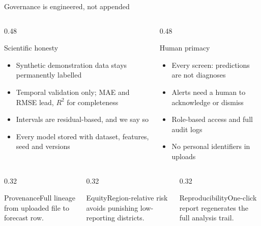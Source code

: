 \documentclass[aspectratio=169,11pt]{beamer}
\begin{document}
\begin{frame}{Governance is engineered, not appended}
  \begin{columns}[c]
    \begin{column}{0.48\textwidth}
      \begin{block}{Scientific honesty}
        \begin{itemize}\small
          \item Synthetic demonstration data stays permanently labelled
          \item Temporal validation only; MAE and RMSE lead, $R^2$ for completeness
          \item Intervals are residual-based, and we say so
          \item Every model stored with dataset, features, seed and versions
        \end{itemize}
      \end{block}
    \end{column}
    \begin{column}{0.48\textwidth}
      \begin{block}{Human primacy}
        \begin{itemize}\small
          \item Every screen: predictions are not diagnoses
          \item Alerts need a human to acknowledge or dismiss
          \item Role-based access and full audit logs
          \item No personal identifiers in uploads
        \end{itemize}
      \end{block}
    \end{column}
  \end{columns}
  \vspace{2mm}
  \begin{columns}[c]
    \begin{column}{0.32\textwidth}\begin{block}{Provenance}\scriptsize Full lineage from uploaded file to forecast row.\end{block}\end{column}
    \begin{column}{0.32\textwidth}\begin{block}{Equity}\scriptsize Region-relative risk avoids punishing low-reporting districts.\end{block}\end{column}
    \begin{column}{0.32\textwidth}\begin{block}{Reproducibility}\scriptsize One-click report regenerates the full analysis trail.\end{block}\end{column}
  \end{columns}
\end{frame}
\end{document}
